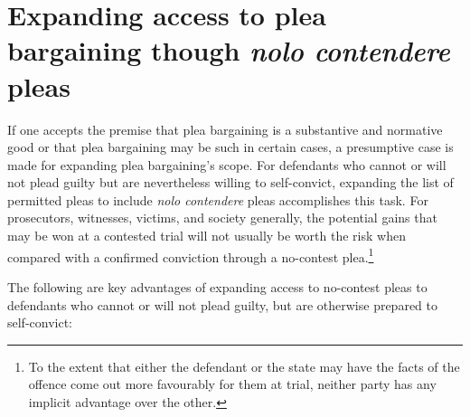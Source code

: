 \section{Expanding access to plea bargaining though \textit{nolo contendere} pleas}

If one accepts the premise that plea bargaining is a substantive and normative good or that plea bargaining may be such in certain cases, a presumptive case is made for expanding plea bargaining's scope. For defendants who cannot or will not plead guilty but are nevertheless willing to self-convict, expanding the list of permitted pleas to include \textit{nolo contendere} pleas accomplishes this task. For prosecutors, witnesses, victims, and society generally, the potential gains that may be won at a contested trial will not usually be worth the risk when compared with a confirmed conviction through a no-contest plea.\footnote{To the extent that either the defendant or the state may have the facts of the offence come out more favourably for them at trial, neither party has any implicit advantage over the other.}

The following are key advantages of expanding access to no-contest pleas to defendants who cannot or will not plead guilty, but are otherwise prepared to self-convict:

